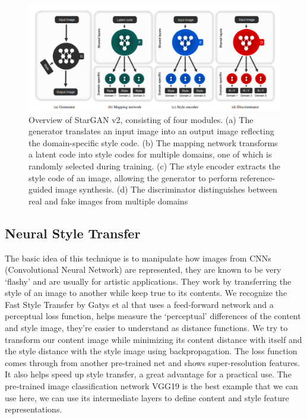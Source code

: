 \documentclass[preprint,12pt]{elsarticle}
\begin{document}
\begin{figure}[ht]
\centering\includegraphics[width=1.0\linewidth]{starganv2.png}
\caption{Overview of StarGAN v2, consisting of four modules. (a) The generator translates an input image into an output image reflecting the domain-specific style code. (b) The mapping network transforms a latent code into style codes for multiple domains, one of which is randomly selected during training. (c) The style encoder extracts the style code of an image, allowing the generator to perform reference-guided image synthesis. (d) The discriminator distinguishes between real and fake images from multiple domains}
\label{fig:starganmodel}
\end{figure}



\subsection{Neural Style Transfer}

The basic idea of this technique is to manipulate how images from CNNs (Convolutional Neural Network) are represented, they are known to be very ‘flashy’ and are usually for artistic applications. They work by transferring the style of an image to another while keep true to its contents. We recognize the Fast Style Transfer by Gatys et al \cite{gatys2015neural} that uses a feed-forward network and a perceptual loss function, helps measure the ‘perceptual’ differences of the content and style image, they’re easier to understand as distance functions. We try to transform our content image while minimizing its content distance with itself and the style distance with the style image using backpropagation. The loss function comes through from another pre-trained net and shows super-resolution features. It also helps speed up style transfer, a great advantage for a practical use. The pre-trained image classification network VGG19 is the best example that we can use here, we can use its intermediate layers to define content and style feature representations.
\end{document}
